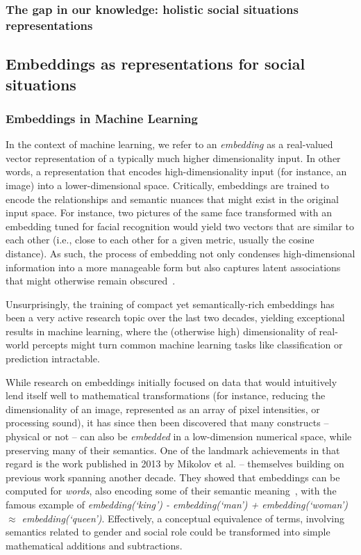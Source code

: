 \subsubsection{The gap in our knowledge: holistic social situations
representations}


\subsection{Embeddings as representations for social situations}

\subsubsection{Embeddings in Machine Learning}

In the context of machine learning, we refer to an \emph{embedding} as a
real-valued vector representation of a typically much higher dimensionality
input. In other words, a representation that encodes high-dimensionality input
(for instance, an image) into a lower-dimensional space. Critically, embeddings
are trained to encode the relationships and semantic nuances that might exist in
the original input space. For instance, two pictures of the same face
transformed with an embedding tuned for facial recognition would yield two
vectors that are similar to each other (i.e., close to each other for a given
metric, usually the cosine distance). As such, the process of embedding not only
condenses high-dimensional information into a more manageable form but also
captures latent associations that might otherwise remain
obscured~\cite{bengio2009learning}.

Unsurprisingly, the training of compact yet semantically-rich embeddings has
been a very active research topic over the last two decades, yielding
exceptional results in machine learning, where the (otherwise high)
dimensionality of real-world percepts might turn common machine learning
tasks like classification or prediction intractable.

While research on embeddings initially focused on data that would intuitively
lend itself well to mathematical transformations (for instance, reducing the
dimensionality of an image, represented as an array of pixel intensities, or
processing sound), it has since then been discovered that many constructs --
physical or not -- can also be \emph{embedded} in a low-dimension numerical
space, while preserving many of their semantics. One of the landmark
achievements in that regard is the work published in 2013 by Mikolov et al. --
themselves building on previous work spanning another decade.  They showed that
embeddings can be computed for \emph{words}, also encoding some of their
semantic meaning~\cite{mikolov2013efficient}, with the famous example of
\emph{embedding(`king') - embedding(`man') + embedding(`woman') $\approx$
embedding(`queen')}. Effectively, a conceptual equivalence of terms, involving
semantics related to gender and social role could be transformed into simple
mathematical additions and subtractions.

